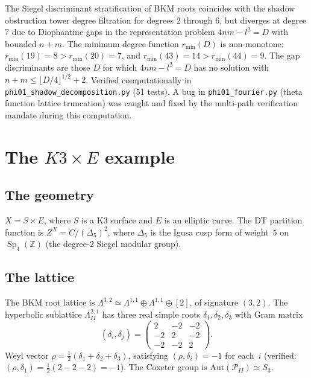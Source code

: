 \documentclass[11pt]{article}
\newcommand{\cP}{\mathcal{P}}
\newcommand{\Z}{\mathbb{Z}}
\newcommand{\Sp}{\operatorname{Sp}}
\begin{document}
\begin{remark}
\label{rem:diophantine-gaps}
The Siegel discriminant stratification of BKM roots coincides with the shadow obstruction tower degree filtration for degrees $2$ through $6$, but diverges at degree $7$ due to Diophantine gaps in the representation problem $4nm - l^2 = D$ with bounded $n + m$. The minimum degree function $r_{\min}(D)$ is non-monotone: $r_{\min}(19) = 8 > r_{\min}(20) = 7$, and $r_{\min}(43) = 14 > r_{\min}(44) = 9$. The gap discriminants are those $D$ for which $4nm - l^2 = D$ has no solution with $n + m \leq \lfloor D/4 \rfloor^{1/2} + 2$. Verified computationally in \texttt{phi01\_shadow\_decomposition.py} (51 tests). A bug in \texttt{phi01\_fourier.py} (theta function lattice truncation) was caught and fixed by the multi-path verification mandate during this computation.
\end{remark}

\section{The $K3 \times E$ example}
\label{sec:k3e-example}

\subsection{The geometry}

$X = S \times E$, where $S$ is a K3 surface and $E$ is an elliptic curve.
The DT partition function is $Z^X = C/(\Delta_5)^2$,
where $\Delta_5$ is the Igusa cusp form of weight~$5$
on $\Sp_4(\Z)$ (the degree-$2$ Siegel modular group).

\subsection{The lattice}

The BKM root lattice is $\Lambda^{3,2} \simeq \Lambda^{1,1} \oplus \Lambda^{1,1} \oplus [2]$, of signature $(3,2)$. The hyperbolic sublattice $\Lambda^{2,1}_{II}$ has three real simple roots $\delta_1, \delta_2, \delta_3$ with Gram matrix
\[
 (\delta_i, \delta_j) = \begin{pmatrix} 2 & -2 & -2 \\ -2 & 2 & -2 \\ -2 & -2 & 2 \end{pmatrix}.
\]
Weyl vector $\rho = \tfrac{1}{2}(\delta_1 + \delta_2 + \delta_3)$, satisfying $(\rho, \delta_i) = -1$ for each~$i$ (verified: $(\rho, \delta_1) = \tfrac{1}{2}(2 - 2 - 2) = -1$). The Coxeter group is $\mathrm{Aut}(\cP_{II}) \simeq S_3$.
\end{document}
